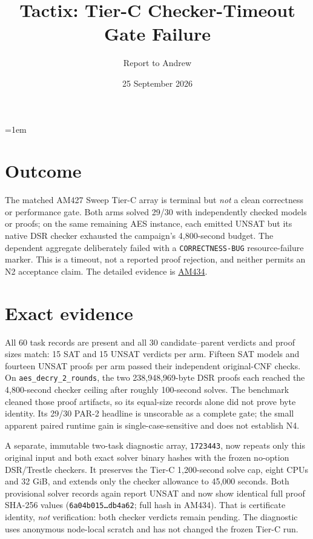\documentclass[10pt]{article}
\title{Tactix: Tier-C Checker-Timeout Gate Failure}
\author{Report to Andrew}
\date{25 September 2026}
\begin{document}
\maketitle
\vspace{-1.5em}
\emergencystretch=1em

\section*{Outcome}
The matched AM427 Sweep Tier-C array is terminal but \emph{not} a clean
correctness or performance gate. Both arms solved 29/30 with independently
checked models or proofs; on the same remaining AES instance, each emitted
UNSAT but its native DSR checker exhausted the campaign's 4,800-second
budget. The dependent aggregate deliberately failed with a
\texttt{CORRECTNESS-BUG} resource-failure marker. This is a timeout, not a
reported proof rejection, and neither permits an N2 acceptance claim.
The detailed evidence is
\href{../../benchmarks/reports/2026-09-25-am434-sweep-tier-c-checker-timeout.md}{AM434}.

\section*{Exact evidence}
All 60 task records are present and all 30 candidate--parent verdicts and
proof sizes match: 15 SAT and 15 UNSAT verdicts per arm. Fifteen SAT models
and fourteen UNSAT proofs per arm passed their independent original-CNF
checks. On \texttt{aes\_decry\_2\_rounds}, the two 238,948,969-byte DSR
proofs each reached the 4,800-second checker ceiling after roughly
100-second solves. The benchmark cleaned those proof artifacts, so its
equal-size records alone did not prove byte identity. Its 29/30 PAR-2
headline is unscorable as a complete gate; the small apparent paired
runtime gain is single-case-sensitive and does not establish N4.

A separate, immutable two-task diagnostic array, \texttt{1723443}, now
repeats only this original input and both exact solver binary hashes with
the frozen no-option DSR/Trestle checkers. It preserves the Tier-C
1,200-second solve cap, eight CPUs and 32 GiB, and extends only the checker
allowance to 45,000 seconds. Both provisional solver records again report
UNSAT and now show identical full proof SHA-256 values
(\texttt{6a04b015\ldots db4a62}; full hash in AM434).
That is certificate identity, \emph{not} verification: both checker verdicts
remain pending. The diagnostic uses anonymous node-local scratch and has
not changed the frozen Tier-C run.
\end{document}

